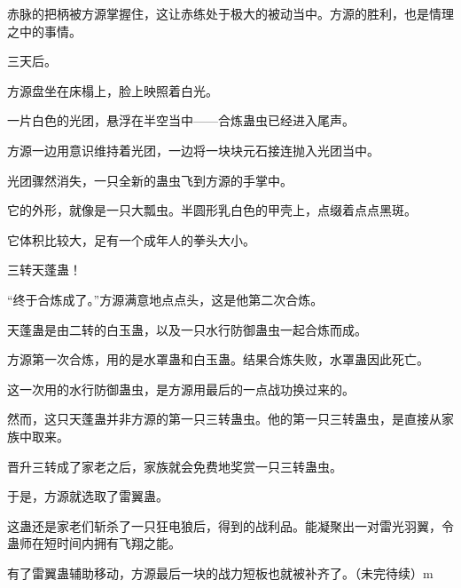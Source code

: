 \begin{this_body}
赤脉的把柄被方源掌握住，这让赤练处于极大的被动当中。方源的胜利，也是情理之中的事情。

三天后。

方源盘坐在床榻上，脸上映照着白光。

一片白色的光团，悬浮在半空当中——合炼蛊虫已经进入尾声。

方源一边用意识维持着光团，一边将一块块元石接连抛入光团当中。

光团骤然消失，一只全新的蛊虫飞到方源的手掌中。

它的外形，就像是一只大瓢虫。半圆形乳白色的甲壳上，点缀着点点黑斑。

它体积比较大，足有一个成年人的拳头大小。

三转天蓬蛊！

“终于合炼成了。”方源满意地点点头，这是他第二次合炼。

天蓬蛊是由二转的白玉蛊，以及一只水行防御蛊虫一起合炼而成。

方源第一次合炼，用的是水罩蛊和白玉蛊。结果合炼失败，水罩蛊因此死亡。

这一次用的水行防御蛊虫，是方源用最后的一点战功换过来的。

然而，这只天蓬蛊并非方源的第一只三转蛊虫。他的第一只三转蛊虫，是直接从家族中取来。

晋升三转成了家老之后，家族就会免费地奖赏一只三转蛊虫。

于是，方源就选取了雷翼蛊。

这蛊还是家老们斩杀了一只狂电狼后，得到的战利品。能凝聚出一对雷光羽翼，令蛊师在短时间内拥有飞翔之能。

有了雷翼蛊辅助移动，方源最后一块的战力短板也就被补齐了。（未完待续）m

\end{this_body}

